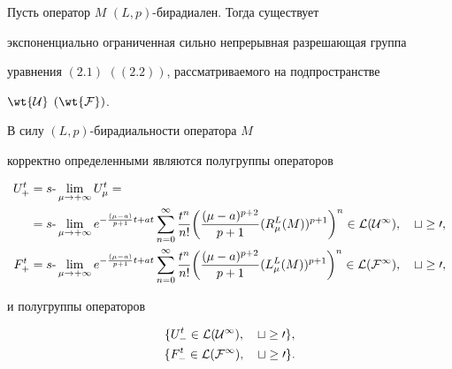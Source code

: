 \begin{thms}


Пусть оператор $M$\; $(L,p)$-бирадиален. Тогда существует


экспоненциально ограниченная  сильно непрерывная разрешающая группа


уравнения $(2.1)$ $((2.2))$, рассматриваемого на подпространстве


$\wt {\cal U}$ $(\wt {\cal F})$.


\end{thms}





\begin{pf}


В силу $(L,p)$-бирадиальности оператора $M$


корректно определенными являются полугруппы операторов


\begin{align}


U^t_{+}&=s\text{-}\lim\limits_{\mu \to +\infty}U^t_{\mu}=\notag \\


%


&=s\text{-}\lim_{\mu \to +\infty} e^{-\frac{(\mu -a)}{p+1}t+at} \sum^\infty


_{n=0} \frac{t^n}{n!}


\bigg( \frac{(\mu -a)^{p+2}}{p+1} (R^L_{\mu } (M))^{p+1}


\bigg) ^n\in\cal L(\cal U^1),\quad t \ge 0,\\


%


F^t_{+}&=s\text{-}\lim_{\mu \to +\infty}


e^{-\frac{(\mu -a)}{p+1}t+at} \sum^\infty


_{n=0} \frac{t^n}{n!} \bigg( \frac{(\mu -a)^{p+2}}{p+1} (L^L_\mu (M))^{p+1}


\bigg) ^n\in\cal L(\cal F^1),  \quad t \ge 0,


\end{align}


и полугруппы операторов


\begin{gather}


\{ U^t_{-}\in\cal L(\cal U^1),\quad t\ge 0\},\\


\{ F^t_{-}\in\cal L(\cal F^1),\quad t\ge 0\}.


\end{gather}



\end{pf}
